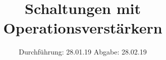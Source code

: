 

\subject{V 51}
\title{Schaltungen mit Operationsverstärkern}
\date{
  Durchführung: 28.01.19
  \hspace{3em}
  Abgabe: 28.02.19
}



\maketitle
\thispagestyle{empty}
\tableofcontents
\newpage





\printbibliography





